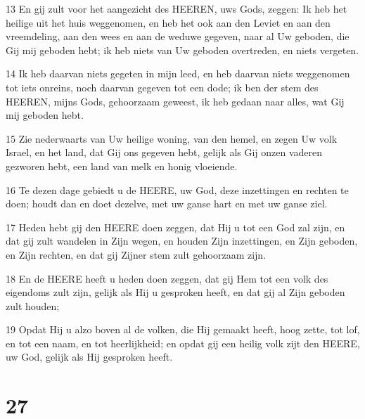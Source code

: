 \par 13 En gij zult voor het aangezicht des HEEREN, uws Gods, zeggen: Ik heb het heilige uit het huis weggenomen, en heb het ook aan den Leviet en aan den vreemdeling, aan den wees en aan de weduwe gegeven, naar al Uw geboden, die Gij mij geboden hebt; ik heb niets van Uw geboden overtreden, en niets vergeten.
\par 14 Ik heb daarvan niets gegeten in mijn leed, en heb daarvan niets weggenomen tot iets onreins, noch daarvan gegeven tot een dode; ik ben der stem des HEEREN, mijns Gods, gehoorzaam geweest, ik heb gedaan naar alles, wat Gij mij geboden hebt.
\par 15 Zie nederwaarts van Uw heilige woning, van den hemel, en zegen Uw volk Israel, en het land, dat Gij ons gegeven hebt, gelijk als Gij onzen vaderen gezworen hebt, een land van melk en honig vloeiende.
\par 16 Te dezen dage gebiedt u de HEERE, uw God, deze inzettingen en rechten te doen; houdt dan en doet dezelve, met uw ganse hart en met uw ganse ziel.
\par 17 Heden hebt gij den HEERE doen zeggen, dat Hij u tot een God zal zijn, en dat gij zult wandelen in Zijn wegen, en houden Zijn inzettingen, en Zijn geboden, en Zijn rechten, en dat gij Zijner stem zult gehoorzaam zijn.
\par 18 En de HEERE heeft u heden doen zeggen, dat gij Hem tot een volk des eigendoms zult zijn, gelijk als Hij u gesproken heeft, en dat gij al Zijn geboden zult houden;
\par 19 Opdat Hij u alzo boven al de volken, die Hij gemaakt heeft, hoog zette, tot lof, en tot een naam, en tot heerlijkheid; en opdat gij een heilig volk zijt den HEERE, uw God, gelijk als Hij gesproken heeft.

\chapter{27}


